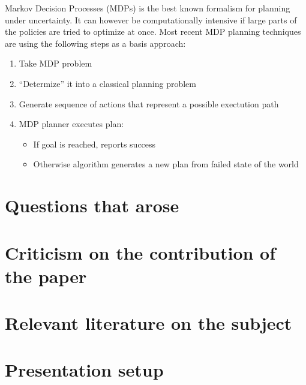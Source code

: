 \documentclass[runningheads,a4paper]{llncs}
\begin{document}
Markov Decision Processes (MDPs) is the best known formalism for planning under
uncertainty. It can however be computationally intensive if large parts of the
policies are tried to optimize at once. Most recent MDP planning techniques are
using the following steps as a basis approach:

\begin{enumerate}
	\item Take MDP problem
	\item ``Determize''  it into a classical planning problem
	\item Generate sequence of actions that represent a possible exectution
			path
	\item MDP planner executes plan:
		\begin{itemize}
			\item If goal is reached, reports success
			\item Otherwise algorithm generates a new plan from failed state of the world
		\end{itemize}
\end{enumerate}

\section{Questions that arose}

\section{Criticism on the contribution of the paper}

\section{Relevant literature on the subject}

\section{Presentation setup}
\end{document}
